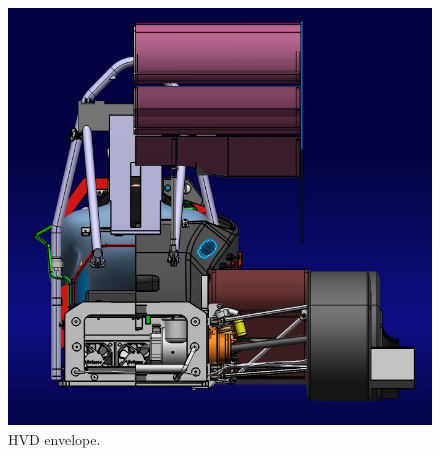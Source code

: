 \begin{figure}[H]
	\centering
	\includegraphics[width=\textwidth]{./img/hvd2.jpg}
	\caption{HVD envelope.}
	\label{fig:hvd2}
\end{figure}
